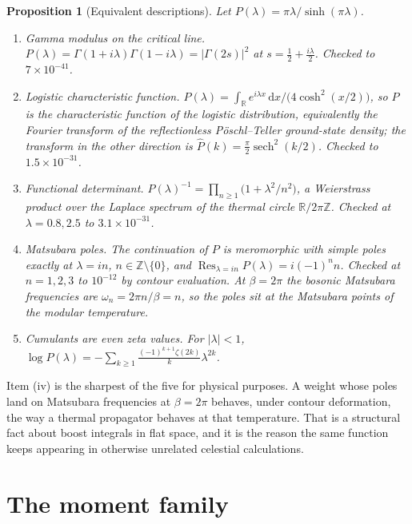 \documentclass[12pt,a4paper]{article}
\theoremstyle{plain}
\newtheorem{proposition}[theorem]{Proposition}
\theoremstyle{definition}
\theoremstyle{remark}
\newcommand{\R}{\mathbb{R}}
\newcommand{\Z}{\mathbb{Z}}
\newcommand{\dd}{\mathrm{d}}
\DeclareMathOperator{\Res}{Res}
\begin{document}
\begin{proposition}[Equivalent descriptions]
\label{prop:faces}
Let $P(\lambda)=\pi\lambda/\sinh(\pi\lambda)$.
\begin{enumerate}[label=\textup{(\roman*)}]
\item \emph{Gamma modulus on the critical line.}
$P(\lambda)=\Gamma(1+i\lambda)\Gamma(1-i\lambda)=|\Gamma(2s)|^2$ at
$s=\tfrac12+\tfrac{i\lambda}{2}$. Checked to $7\times10^{-41}$.
\item \emph{Logistic characteristic function.}
$P(\lambda)=\int_\R e^{i\lambda x}\,\dd x/\bigl(4\cosh^2(x/2)\bigr)$,
so $P$ is the characteristic function of the logistic distribution,
equivalently the Fourier transform of the reflectionless
P\"oschl--Teller ground-state density; the transform in the other
direction is $\widehat P(k)=\tfrac{\pi}{2}\operatorname{sech}^2(k/2)$.
Checked to $1.5\times10^{-31}$.
\item \emph{Functional determinant.}
$P(\lambda)^{-1}=\prod_{n\ge1}\bigl(1+\lambda^2/n^2\bigr)$, a
Weierstrass product over the Laplace spectrum of the thermal circle
$\R/2\pi\Z$. Checked at $\lambda=0.8,2.5$ to $3.1\times10^{-31}$.
\item \emph{Matsubara poles.}
The continuation of $P$ is meromorphic with simple poles exactly at
$\lambda=in$, $n\in\Z\setminus\{0\}$, and
$\Res_{\lambda=in}P(\lambda)=i(-1)^n n$. Checked at $n=1,2,3$ to
$10^{-12}$ by contour evaluation. At $\beta=2\pi$ the bosonic Matsubara
frequencies are $\omega_n=2\pi n/\beta=n$, so the poles sit at the
Matsubara points of the modular temperature.
\item \emph{Cumulants are even zeta values.}
For $|\lambda|<1$,
$\log P(\lambda)=-\sum_{k\ge1}\frac{(-1)^{k+1}\zeta(2k)}{k}\lambda^{2k}$.
\end{enumerate}
\end{proposition}

Item (iv) is the sharpest of the five for physical purposes. A weight
whose poles land on Matsubara frequencies at $\beta=2\pi$ behaves,
under contour deformation, the way a thermal propagator behaves at that
temperature. That is a structural fact about boost integrals in flat
space, and it is the reason the same function keeps appearing in
otherwise unrelated celestial calculations.

\section{The moment family}
\end{document}
